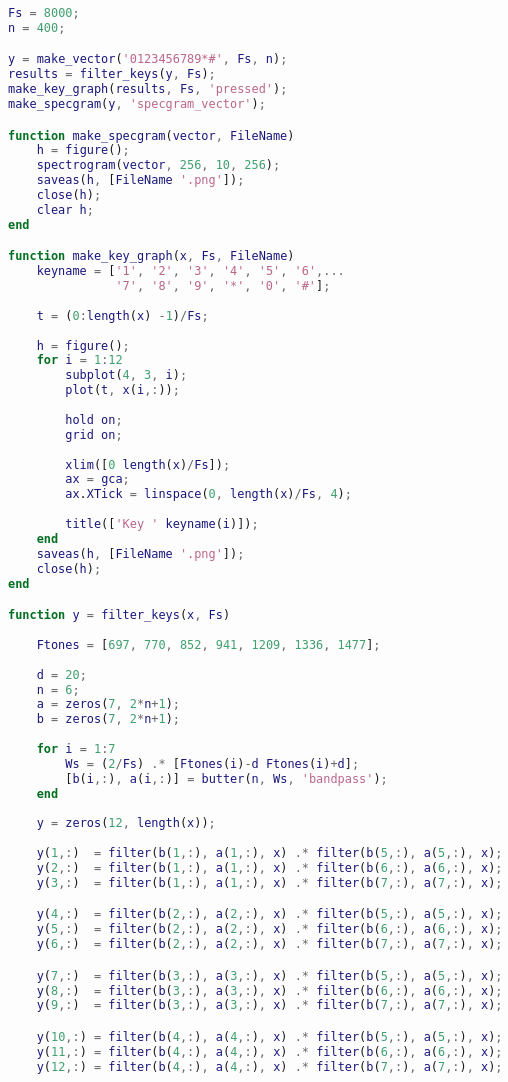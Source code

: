 \documentclass[11pt, a4paper]{article}
\begin{document}
\begin{lstlisting}[language=matlab, frame=single] 
Fs = 8000;
n = 400;

y = make_vector('0123456789*#', Fs, n);
results = filter_keys(y, Fs);
make_key_graph(results, Fs, 'pressed');
make_specgram(y, 'specgram_vector');

function make_specgram(vector, FileName)
    h = figure();
    spectrogram(vector, 256, 10, 256);
    saveas(h, [FileName '.png']);
    close(h);
    clear h;
end

function make_key_graph(x, Fs, FileName)
    keyname = ['1', '2', '3', '4', '5', '6',...
               '7', '8', '9', '*', '0', '#'];
    
    t = (0:length(x) -1)/Fs;
    
    h = figure();
    for i = 1:12
        subplot(4, 3, i);
        plot(t, x(i,:));
        
        hold on;
        grid on; 
        
        xlim([0 length(x)/Fs]);
        ax = gca;
        ax.XTick = linspace(0, length(x)/Fs, 4);
        
        title(['Key ' keyname(i)]); 
    end
    saveas(h, [FileName '.png']);
    close(h);
end

function y = filter_keys(x, Fs)
    
    Ftones = [697, 770, 852, 941, 1209, 1336, 1477];
    
    d = 20;
    n = 6;
    a = zeros(7, 2*n+1);
    b = zeros(7, 2*n+1);
    
    for i = 1:7
        Ws = (2/Fs) .* [Ftones(i)-d Ftones(i)+d];
        [b(i,:), a(i,:)] = butter(n, Ws, 'bandpass');
    end
    
    y = zeros(12, length(x));
    
    y(1,:)  = filter(b(1,:), a(1,:), x) .* filter(b(5,:), a(5,:), x);
    y(2,:)  = filter(b(1,:), a(1,:), x) .* filter(b(6,:), a(6,:), x);
    y(3,:)  = filter(b(1,:), a(1,:), x) .* filter(b(7,:), a(7,:), x);

    y(4,:)  = filter(b(2,:), a(2,:), x) .* filter(b(5,:), a(5,:), x);
    y(5,:)  = filter(b(2,:), a(2,:), x) .* filter(b(6,:), a(6,:), x);
    y(6,:)  = filter(b(2,:), a(2,:), x) .* filter(b(7,:), a(7,:), x);

    y(7,:)  = filter(b(3,:), a(3,:), x) .* filter(b(5,:), a(5,:), x);
    y(8,:)  = filter(b(3,:), a(3,:), x) .* filter(b(6,:), a(6,:), x);
    y(9,:)  = filter(b(3,:), a(3,:), x) .* filter(b(7,:), a(7,:), x);

    y(10,:) = filter(b(4,:), a(4,:), x) .* filter(b(5,:), a(5,:), x);
    y(11,:) = filter(b(4,:), a(4,:), x) .* filter(b(6,:), a(6,:), x);
    y(12,:) = filter(b(4,:), a(4,:), x) .* filter(b(7,:), a(7,:), x);
    

\end{lstlisting}
\end{document}
